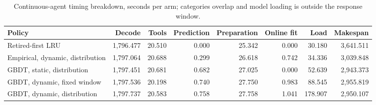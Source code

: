 \begin{table}[t]
\centering\small
\caption{Continuous-agent timing breakdown, seconds per arm; categories overlap and model loading is outside the response window.}
\label{tab:continuous-overhead}
\setlength{\tabcolsep}{4pt}
\begin{tabular}{@{}lrrrrrrr@{}}
\toprule
Policy & Decode & Tools & Prediction & Preparation & Online fit & Load & Makespan \\
\midrule
Retired-first LRU & 1,796.477 & 20.510 & 0.000 & 25.342 & 0.000 & 30.180 & 3,641.511 \\
Empirical, dynamic, distribution & 1,797.064 & 20.688 & 0.299 & 26.618 & 0.742 & 34.336 & 3,039.848 \\
GBDT, static, distribution & 1,797.451 & 20.681 & 0.682 & 27.025 & 0.000 & 52.639 & 2,943.373 \\
GBDT, dynamic, fixed window & 1,797.536 & 20.198 & 0.740 & 27.750 & 0.983 & 88.545 & 2,955.819 \\
GBDT, dynamic, distribution & 1,797.737 & 20.583 & 0.758 & 27.758 & 1.041 & 178.907 & 2,950.107 \\
\bottomrule
\end{tabular}
\end{table}
